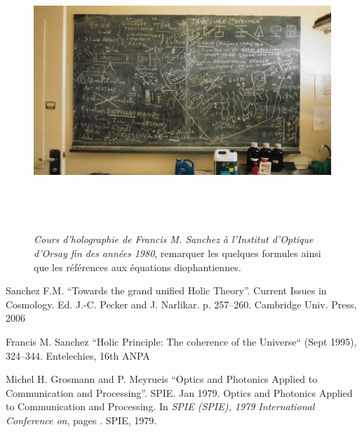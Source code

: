 \documentclass[a4paper,12pt]{article}
\begin{document}
\begin{appendix}
\begin{figure}[h]
\centering
\includegraphics[width=14.5cm,height=10.5cm]{./figures/fs-tab.png}
\caption [Cours d'holographie à l'Institut d'Optique d'Orsay]{\textit{Cours d'holographie de Francis M. Sanchez à l'Institut d'Optique d'Orsay fin des années 1980}, remarquer les quelques formules ainsi que les références aux équations diophantiennes.} 
\label{fig:3:figure3}
\end{figure}

  


\begin{thebibliography}{1}

 Sanchez F.M. ``Towards the grand unified Holic Theory''. Current Issues in Cosmology. Ed. J.-C. Pecker and J. Narlikar. p. 257--260.
\newblock Cambridge Univ. Press, 2006

 Francis M. Sanchez ``Holic Principle: The coherence of the Universe`` (Sept 1995), 324--344.
\newblock Entelechies, 16th ANPA

 Michel H. Grosmann and P. Meyrueis ``Optics and Photonics Applied to Communication and Processing''. SPIE.  Jan 1979.
\newblock Optics and Photonics Applied to Communication and Processing.
\newblock In {\em SPIE (SPIE), 1979 International Conference on}, pages . SPIE, 1979.
  

\end{thebibliography}
\end{appendix}
\end{document}
